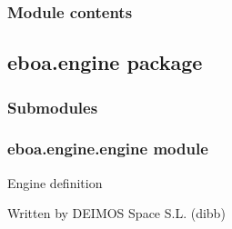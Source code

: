 \begin{fulllineitems}

\begin{fulllineitems}
\label{\detokenize{eboa.datamodel:eboa.datamodel.gauges.Gauge.name}}
\end{fulllineitems}


\begin{fulllineitems}
\label{\detokenize{eboa.datamodel:eboa.datamodel.gauges.Gauge.system}}
\end{fulllineitems}


\end{fulllineitems}



\subsubsection{Module contents}
\label{\detokenize{eboa.datamodel:module-eboa.datamodel}}\label{\detokenize{eboa.datamodel:module-contents}}

\subsection{eboa.engine package}
\label{\detokenize{eboa.engine:eboa-engine-package}}\label{\detokenize{eboa.engine::doc}}

\subsubsection{Submodules}
\label{\detokenize{eboa.engine:submodules}}

\subsubsection{eboa.engine.engine module}
\label{\detokenize{eboa.engine:module-eboa.engine.engine}}\label{\detokenize{eboa.engine:eboa-engine-engine-module}}
Engine definition

Written by DEIMOS Space S.L. (dibb)


